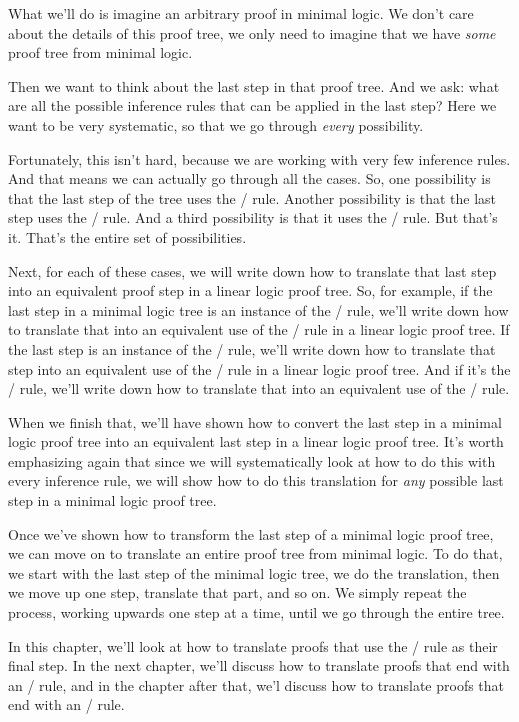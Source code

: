 \documentclass[../../../main.tex]{subfiles}
\begin{document}
What we'll do is imagine an arbitrary proof in minimal logic. We don't care about the details of this proof tree, we only need to imagine that we have \emph{some} proof tree from minimal logic.

Then we want to think about the last step in that proof tree. And we ask: what are all the possible inference rules that can be applied in the last step? Here we want to be very systematic, so that we go through \emph{every} possibility.

Fortunately, this isn't hard, because we are working with very few inference rules. And that means we can actually go through all the cases. So, one possibility is that the last step of the tree uses the \startrule/ rule. Another possibility is that the last step uses the \implIntro/ rule. And a third possibility is that it uses the \implElim/ rule. But that's it. That's the entire set of possibilities.

Next, for each of these cases, we will write down how to translate that last step into an equivalent proof step in a linear logic proof tree. So, for example, if the last step in a minimal logic tree is an instance of the \startrule/ rule, we'll write down how to translate that into an equivalent use of the \startrule/ rule in a linear logic proof tree. If the last step is an instance of the \implIntro/ rule, we'll write down how to translate that step into an equivalent use of the \lolliIntro/ rule in a linear logic proof tree. And if it's the \implElim/ rule, we'll write down how to translate that into an equivalent use of the \lolliElim/ rule.

When we finish that, we'll have shown how to convert the last step in a minimal logic proof tree into an equivalent last step in a linear logic proof tree. It's worth emphasizing again that since we will systematically look at how to do this with every inference rule, we will show how to do this translation for \emph{any} possible last step in a minimal logic proof tree. 

Once we've shown how to transform the last step of a minimal logic proof tree, we can move on to translate an entire proof tree from minimal logic. To do that, we start with the last step of the minimal logic tree, we do the translation, then we move up one step, translate that part, and so on. We simply repeat the process, working upwards one step at a time, until we go through the entire tree.

In this chapter, we'll look at how to translate proofs that use the \startrule/ rule as their final step. In the next chapter, we'll discuss how to translate proofs that end with an \implIntro/ rule, and in the chapter after that, we'l discuss how to translate proofs that end with an \implElim/ rule.
\end{document}
